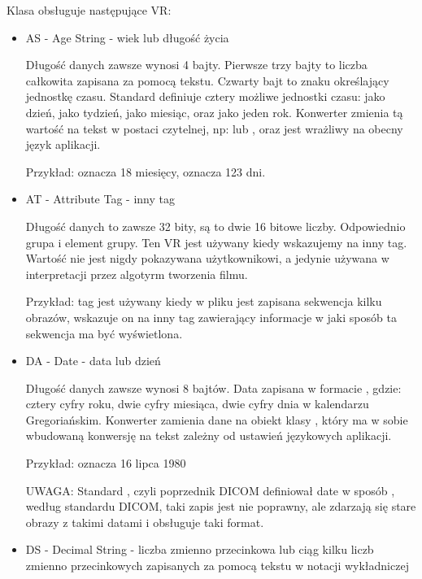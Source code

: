 Klasa obsługuje następujące VR:
\begin{itemize}
    \item AS - Age String - wiek lub długość życia

    Długość danych zawsze wynosi 4 bajty.
    Pierwsze trzy bajty to liczba całkowita zapisana za pomocą tekstu.
    Czwarty bajt to znaku określający jednostkę czasu.
    Standard definiuje cztery możliwe jednostki czasu:  jako dzień,  jako tydzień,  jako miesiąc, oraz  jako jeden rok.
    Konwerter zmienia tą wartość na tekst w postaci czytelnej, np:  lub , oraz jest wrażliwy na obecny język aplikacji.
    
    Przykład:  oznacza 18 miesięcy,  oznacza 123 dni.

    \item AT - Attribute Tag - inny tag

    Długość danych to zawsze 32 bity, są to dwie 16 bitowe liczby.
    Odpowiednio grupa i element grupy.
    Ten VR jest używany kiedy wskazujemy na inny tag.
    Wartość nie jest nigdy pokazywana użytkownikowi, a jedynie używana w interpretacji przez algotyrm tworzenia filmu.
    
    Przykład: tag  jest używany kiedy w pliku jest zapisana sekwencja kilku obrazów, wskazuje on na inny tag zawierający informacje w jaki sposób ta sekwencja ma być wyświetlona.
    
    \item DA - Date - data lub dzień

    Długość danych zawsze wynosi 8 bajtów.
    Data zapisana w formacie , gdzie:  cztery cyfry roku,  dwie cyfry miesiąca,  dwie cyfry dnia w kalendarzu Gregoriańskim.
    Konwerter zamienia dane na obiekt klasy , który ma w sobie wbudowaną konwersję na tekst zależny od ustawień językowych aplikacji.
    
    Przykład:  oznacza 16 lipca 1980
    
    UWAGA: Standard , czyli poprzednik DICOM definiował date w sposób , według standardu DICOM, taki zapis jest nie poprawny, ale zdarzają się stare obrazy z takimi datami i  obsługuje taki format.

    \item DS - Decimal String - liczba zmienno przecinkowa lub ciąg kilku liczb zmienno przecinkowych zapisanych za pomocą tekstu w notacji wykładniczej


\end{itemize}
